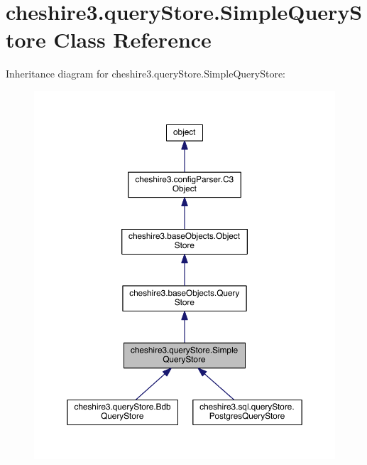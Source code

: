 \hypertarget{classcheshire3_1_1query_store_1_1_simple_query_store}{\section{cheshire3.\-query\-Store.\-Simple\-Query\-Store Class Reference}
\label{classcheshire3_1_1query_store_1_1_simple_query_store}
}


Inheritance diagram for cheshire3.\-query\-Store.\-Simple\-Query\-Store\-:
\nopagebreak
\begin{figure}[H]
\begin{center}
\leavevmode
\includegraphics[width=350pt]{classcheshire3_1_1query_store_1_1_simple_query_store__inherit__graph}
\end{center}
\end{figure}


